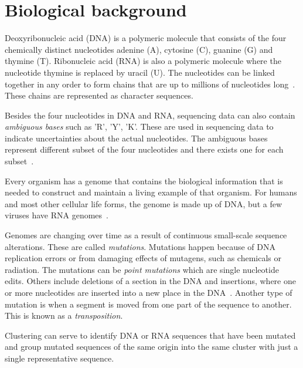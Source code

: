 \section{Biological background}
\label{sec:biology}

Deoxyribonucleic acid (DNA) is a polymeric molecule that consists of the four
chemically distinct nucleotides adenine (A), cytosine (C), guanine (G) and
thymine (T). Ribonucleic acid (RNA) is also a polymeric molecule where the
nucleotide thymine is replaced by uracil (U). The nucleotides can be linked
together in any order to form chains that are up to millions of nucleotides
long~\cite[pp.~8--9]{brown}. These chains are represented as character
sequences.

Besides the four nucleotides in DNA and RNA, sequencing data can also contain
\emph{ambiguous bases} such as 'R', 'Y', 'K'. These are used in sequencing data
to indicate uncertainties about the actual nucleotides. The ambiguous bases
represent different subset of the four nucleotides and there exists one for
each subset~\cite{tao}.

Every organism has a genome that contains the biological information that is
needed to construct and maintain a living example of that organism. For humans
and most other cellular life forms, the genome is made up of DNA, but a few
viruses have RNA genomes~\cite[pp.~3--4]{brown}.

Genomes are changing over time as a result of continuous small-scale sequence
alterations. These are called \textit{mutations}. Mutations happen because of
DNA replication errors or from damaging effects of mutagens, such as chemicals
or radiation. The mutations can be \textit{point mutations} which are single
nucleotide edits. Others include deletions of a section in the DNA and
insertions, where one or more nucleotides are inserted into a new place in the
DNA~\cite[pp.~505--506]{brown}. Another type of mutation is when a segment is
moved from one part of the sequence to another. This is known as a
\emph{transposition}.

Clustering can serve to identify DNA or RNA sequences that have been mutated and
group mutated sequences of the same origin into the same cluster with just a
single representative sequence.
